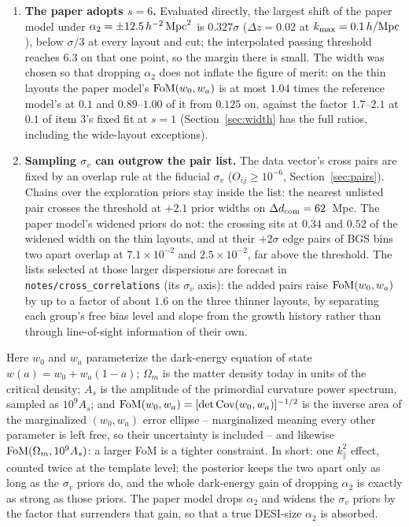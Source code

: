 \documentclass[11pt]{article}
\newcommand{\kmax}{k_{\rm max}}
\newcommand{\hMpc}{\,h/{\rm Mpc}}
\newcommand{\aunit}{\,h^{-2}\,{\rm Mpc}^2}
\newcommand{\sv}{\sigma_v}
\newcommand{\dcom}{$\Delta d_{\rm com} = 62$~Mpc}
\newcommand{\us}{\_\allowbreak}
\begin{document}
\begin{enumerate}
    ratio is $0.93$--$1.16$ and the gain is gone
    (Figure~\ref{fig:sigvwidth}).  Widening one sample's dispersions
    alone never suffices on the thin layouts at $0.1$ and above.
  \item \textbf{The paper adopts $s = 6$.}  Evaluated directly, the
    largest shift of the paper model under
    $\alpha_2 = \pm 12.5\aunit$ is
    $0.327\sigma$ ($\Delta z = 0.02$ at $\kmax = 0.1\hMpc$), below
    $\sigma/3$ at every layout and cut; the interpolated passing
    threshold reaches $6.3$ on that one point, so the margin there is
    small.  The width was chosen so that dropping $\alpha_2$ does not
    inflate the figure of merit: on the thin layouts the paper
    model's ${\rm FoM}(w_0, w_a)$ is at most $1.04$ times the
    reference model's at $0.1$ and $0.89$--$1.00$ of it from $0.125$
    on, against the factor $1.7$--$2.1$ at $0.1$ of item 3's fixed
    fit at $s = 1$ (Section~\ref{sec:width} has the full ratios,
    including the wide-layout exceptions).
  \item \textbf{Sampling $\sv$ can outgrow the pair list.}  The data
    vector's cross pairs are fixed by an overlap rule at the fiducial
    $\sv$ ($O_{ij} \ge 10^{-6}$, Section~\ref{sec:pairs}).  Chains
    over the exploration priors stay inside the list: the nearest
    unlisted pair crosses the threshold at $+2.1$ prior widths on
    \dcom{}.  The paper model's widened priors do not: the crossing
    sits at $0.34$ and $0.52$ of the widened width on the thin
    layouts, and at their $+2\sigma$ edge pairs of BGS bins two apart
    overlap at $7.1\times10^{-2}$ and $2.5\times10^{-2}$, far above
    the threshold.  The lists selected at those larger dispersions
    are forecast in \texttt{notes/cross\us correlations} (its
    $\sv$ axis): the added pairs raise ${\rm FoM}(w_0, w_a)$ by up
    to a factor of about $1.6$ on the three thinner layouts, by
    separating each group's free bias level and slope from the
    growth history rather than through line-of-sight information of
    their own.
\end{enumerate}
Here $w_0$ and $w_a$ parameterize the dark-energy equation of state
$w(a) = w_0 + w_a(1 - a)$; $\Omega_m$ is the matter density today in
units of the critical density; $A_s$ is the amplitude of the primordial
curvature power spectrum, sampled as $10^9 A_s$; and
${\rm FoM}(w_0, w_a) = [\det{\rm Cov}(w_0, w_a)]^{-1/2}$ is the inverse
area of the marginalized $(w_0, w_a)$ error ellipse -- marginalized
meaning every other parameter is left free, so their uncertainty is
included -- and likewise ${\rm FoM}(\Omega_m, 10^9 A_s)$: a larger FoM
is a tighter constraint.  In short: one $k_\parallel^2$ effect,
counted twice at the template level; the posterior keeps the two apart
only as long as the $\sv$ priors do, and the whole dark-energy gain of
dropping $\alpha_2$ is exactly as strong as those priors.  The paper
model drops $\alpha_2$ and widens the $\sv$ priors by the factor that
surrenders that gain, so that a true DESI-size $\alpha_2$ is absorbed.
\end{document}
